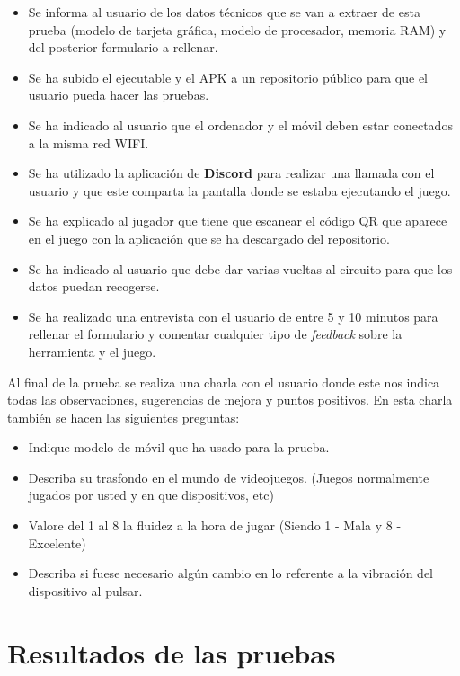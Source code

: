 \begin {itemize}
\item Se informa al usuario de los datos t\'ecnicos que se van a extraer de esta prueba (modelo de tarjeta gr\'afica, modelo de procesador, memoria RAM) y del posterior formulario a rellenar.
\item Se ha subido el ejecutable y el APK a un repositorio p\'ublico para que el usuario pueda hacer las pruebas.
\item Se ha indicado al usuario que el ordenador y el m\'ovil deben estar conectados a la misma red WIFI.
\item Se ha utilizado la aplicaci\'on de \textbf{Discord} para realizar una llamada con el usuario y que este comparta la pantalla donde se estaba ejecutando el juego.
\item Se ha explicado al jugador que tiene que escanear el c\'odigo QR que aparece en el juego con la aplicaci\'on que se ha descargado del repositorio.
\item Se ha indicado al usuario que debe dar varias vueltas al circuito para que los datos puedan recogerse. 
\item Se ha realizado una entrevista con el usuario de entre 5 y 10 minutos para rellenar el formulario y comentar cualquier tipo de \textit{feedback} sobre la herramienta y el juego.
\end {itemize}

Al final de la prueba se realiza una charla con el usuario donde este nos indica todas las observaciones, sugerencias de mejora y puntos positivos. En esta charla tambi\'en se hacen las siguientes preguntas:

\begin {itemize}
\item Indique modelo de m\'ovil que ha usado para la prueba.
\item Describa su trasfondo en el mundo de videojuegos. (Juegos normalmente jugados por usted y en que dispositivos, etc)
\item Valore del 1 al 8 la fluidez a la hora de jugar (Siendo 1 - Mala y 8 - Excelente)
\item Describa si fuese necesario alg\'un cambio en lo referente a la vibraci\'on del dispositivo al pulsar.
\end {itemize}

\section{Resultados de las pruebas}

